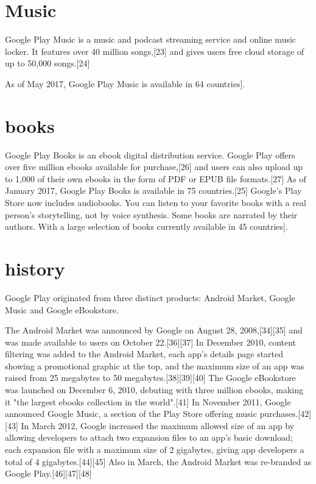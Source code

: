 \documentclass{article}                    %
\begin{document}
\section{ Music}    
Google Play Music is a music and podcast streaming service and online music locker. It features over 40 million songs,[23] and gives users free cloud storage of up to 50,000 songs.[24]

As of May 2017, Google Play Music is available in 64 countries].
\section{ books}    
Google Play Books is an ebook digital distribution service. Google Play offers over five million ebooks available for purchase,[26] and users can also upload up to 1,000 of their own ebooks in the form of PDF or EPUB file formats.[27] As of January 2017, Google Play Books is available in 75 countries.[25] Google's Play Store now includes audiobooks. You can listen to your favorite books with a real person's storytelling, not by voice synthesis. Some books are narrated by their authors. With a large selection of books currently available in 45 countries].
\section{ history}    
Google Play originated from three distinct products: Android Market, Google Music and Google eBookstore.

The Android Market was announced by Google on August 28, 2008,[34][35] and was made available to users on October 22.[36][37] In December 2010, content filtering was added to the Android Market, each app's details page started showing a promotional graphic at the top, and the maximum size of an app was raised from 25 megabytes to 50 megabytes.[38][39][40] The Google eBookstore was launched on December 6, 2010, debuting with three million ebooks, making it "the largest ebooks collection in the world".[41] In November 2011, Google announced Google Music, a section of the Play Store offering music purchases.[42][43] In March 2012, Google increased the maximum allowed size of an app by allowing developers to attach two expansion files to an app's basic download; each expansion file with a maximum size of 2 gigabytes, giving app developers a total of 4 gigabytes.[44][45] Also in March, the Android Market was re-branded as Google Play.[46][47][48]
\end{document}

